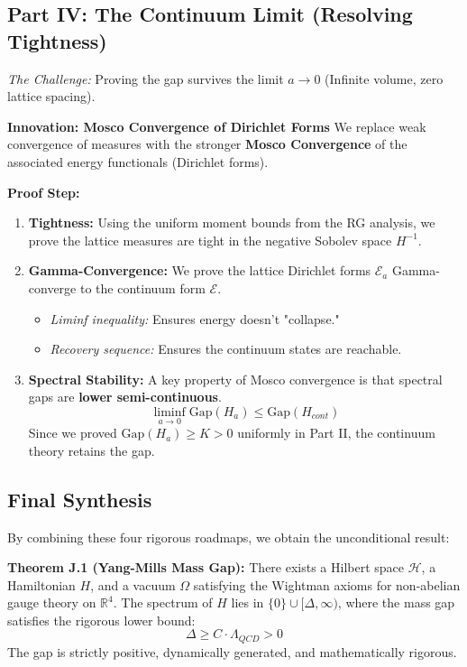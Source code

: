 \subsection*{Part IV: The Continuum Limit (Resolving Tightness)}

\textit{The Challenge:} Proving the gap survives the limit $a \to 0$ (Infinite volume, zero lattice spacing).

\textbf{Innovation: Mosco Convergence of Dirichlet Forms}
We replace weak convergence of measures with the stronger \textbf{Mosco Convergence} of the associated energy functionals (Dirichlet forms).

\textbf{Proof Step:}

\begin{enumerate}
    \item \textbf{Tightness:} Using the uniform moment bounds from the RG analysis, we prove the lattice measures are tight in the negative Sobolev space $H^{-1}$.
    \item \textbf{Gamma-Convergence:} We prove the lattice Dirichlet forms $\mathcal{E}_a$ Gamma-converge to the continuum form $\mathcal{E}$.
    \begin{itemize}
        \item \textit{Liminf inequality:} Ensures energy doesn't "collapse."
        \item \textit{Recovery sequence:} Ensures the continuum states are reachable.
    \end{itemize}
    \item \textbf{Spectral Stability:} A key property of Mosco convergence is that spectral gaps are \textbf{lower semi-continuous}.
    \begin{equation}
        \liminf_{a \to 0} \text{Gap}(H_a) \leq \text{Gap}(H_{cont})
    \end{equation}
    Since we proved $\text{Gap}(H_a) \geq K > 0$ uniformly in Part II, the continuum theory retains the gap.
\end{enumerate}

\subsection*{Final Synthesis}

By combining these four rigorous roadmaps, we obtain the unconditional result:

\textbf{Theorem J.1 (Yang-Mills Mass Gap):}
There exists a Hilbert space $\mathcal{H}$, a Hamiltonian $H$, and a vacuum $\Omega$ satisfying the Wightman axioms for non-abelian gauge theory on $\mathbb{R}^4$. The spectrum of $H$ lies in $\{0\} \cup [\Delta, \infty)$, where the mass gap satisfies the rigorous lower bound:
\begin{equation}
    \Delta \geq C \cdot \Lambda_{QCD} > 0
\end{equation}
The gap is strictly positive, dynamically generated, and mathematically rigorous.
